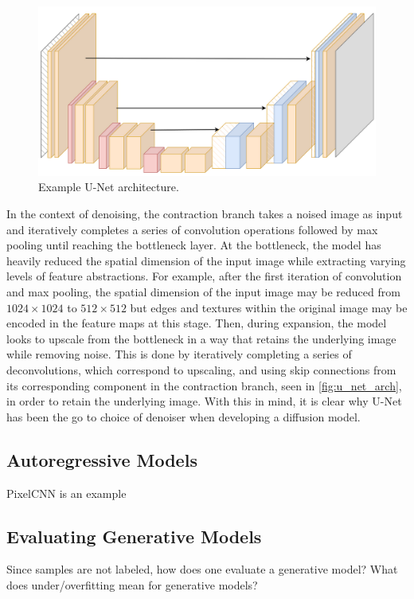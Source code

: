 \documentclass[11pt]{article}
\begin{document}
\begin{figure}[t]
    \centering
    \includegraphics[width=\columnwidth]{./figures/generative_models/unet.png}
    \caption{Example U-Net architecture. }
    \label{fig:u_net_arch}
\end{figure}

In the context of denoising, the contraction branch takes a noised image as input and iteratively completes a series of convolution operations followed by max pooling until reaching the bottleneck layer. At the bottleneck, the model has heavily reduced the spatial dimension of the input image while extracting varying levels of feature abstractions. For example, after the first iteration of convolution and max pooling, the spatial dimension of the input image may be reduced from $1024\times1024$ to $512\times512$ but edges and textures within the original image may be encoded in the feature maps at this stage. Then, during expansion, the model looks to upscale from the bottleneck in a way that retains the underlying image while removing noise. This is done by iteratively completing a series of deconvolutions, which correspond to upscaling, and using skip connections from its corresponding component in the contraction branch, seen in \autoref{fig:u_net_arch}, in order to retain the underlying image. With this in mind, it is clear why U-Net has been the go to choice of denoiser when developing a diffusion model.

\subsection{\TODO{: } Autoregressive Models}
PixelCNN is an example

\subsection{\TODO{: }Evaluating Generative Models}
Since samples are not labeled, how does one evaluate a generative model? What does under/overfitting mean for generative models?
\end{document}
